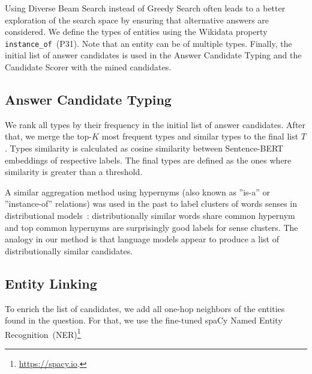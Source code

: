 Using Diverse Beam Search instead of Greedy Search often leads to a better exploration of the search space by ensuring that alternative answers are considered.  We define the types of entities using the Wikidata property \texttt{instance\_of}~(P31). Note that an entity can be of multiple types. Finally, the initial list of answer candidates is used in the Answer Candidate Typing and the Candidate Scorer with the mined candidates. 

\subsection{Answer Candidate Typing} \label{sec:act_selection:act_typing}
We rank all types by their frequency in the initial list of answer candidates. 
After that, we merge the top-$K$ most frequent types and similar types to the final list $T$.
Types similarity is calculated as cosine similarity between Sentence-BERT~\cite{reimers-2019-sentence-bert} embeddings of respective labels. The final types are defined as the ones where similarity is greater than a threshold.

A similar aggregation method using hypernyms (also known as ''is-a''  or ''instance-of'' relations) was used in the past to label clusters of words senses in distributional models~\cite{biemann2013text}: distributionally similar words share common hypernym and top common hypernyms are surprisingly good labels for sense clusters. The analogy in our method is that language models appear to produce a list of distributionally similar candidates.

\subsection{Entity Linking}
To enrich the list of candidates, we add all one-hop neighbors of the entities found in the question. For that, we use the fine-tuned spaCy Named Entity Recognition~(NER)\footnote{\url{https://spacy.io}.}


